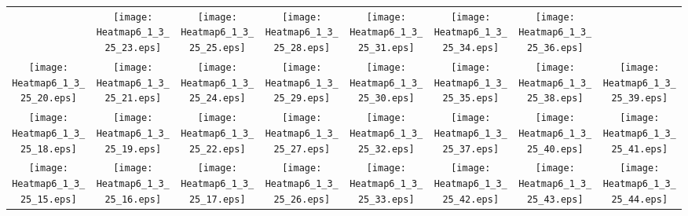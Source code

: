 \documentclass{standalone}
\begin{document}
\renewcommand{\arraystretch}{0}
\setlength{\tabcolsep}{0pt}
\begin{tabular}{ *8{c} }
 & \texttt{[image: Heatmap6\_1\_3\_25\_23.eps]} & \texttt{[image: Heatmap6\_1\_3\_25\_25.eps]} & \texttt{[image: Heatmap6\_1\_3\_25\_28.eps]} & \texttt{[image: Heatmap6\_1\_3\_25\_31.eps]} & \texttt{[image: Heatmap6\_1\_3\_25\_34.eps]} & \texttt{[image: Heatmap6\_1\_3\_25\_36.eps]} &  \\
\texttt{[image: Heatmap6\_1\_3\_25\_20.eps]} & \texttt{[image: Heatmap6\_1\_3\_25\_21.eps]} & \texttt{[image: Heatmap6\_1\_3\_25\_24.eps]} & \texttt{[image: Heatmap6\_1\_3\_25\_29.eps]} & \texttt{[image: Heatmap6\_1\_3\_25\_30.eps]} & \texttt{[image: Heatmap6\_1\_3\_25\_35.eps]} & \texttt{[image: Heatmap6\_1\_3\_25\_38.eps]} & \texttt{[image: Heatmap6\_1\_3\_25\_39.eps]} \\
\texttt{[image: Heatmap6\_1\_3\_25\_18.eps]} & \texttt{[image: Heatmap6\_1\_3\_25\_19.eps]} & \texttt{[image: Heatmap6\_1\_3\_25\_22.eps]} & \texttt{[image: Heatmap6\_1\_3\_25\_27.eps]} & \texttt{[image: Heatmap6\_1\_3\_25\_32.eps]} & \texttt{[image: Heatmap6\_1\_3\_25\_37.eps]} & \texttt{[image: Heatmap6\_1\_3\_25\_40.eps]} & \texttt{[image: Heatmap6\_1\_3\_25\_41.eps]} \\
\texttt{[image: Heatmap6\_1\_3\_25\_15.eps]} & \texttt{[image: Heatmap6\_1\_3\_25\_16.eps]} & \texttt{[image: Heatmap6\_1\_3\_25\_17.eps]} & \texttt{[image: Heatmap6\_1\_3\_25\_26.eps]} & \texttt{[image: Heatmap6\_1\_3\_25\_33.eps]} & \texttt{[image: Heatmap6\_1\_3\_25\_42.eps]} & \texttt{[image: Heatmap6\_1\_3\_25\_43.eps]} & \texttt{[image: Heatmap6\_1\_3\_25\_44.eps]} \\

\end{tabular}
\end{document}
